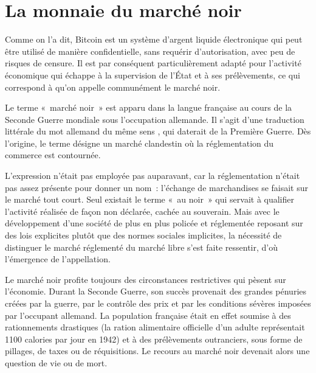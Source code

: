 
\section*{La monnaie du marché noir}

Comme on l'a dit, Bitcoin est un système d'argent liquide électronique qui peut être utilisé de manière confidentielle, sans requérir d'autorisation, avec peu de risques de censure. Il est par conséquent particulièrement adapté pour l'activité économique qui échappe à la supervision de l'État et à ses prélèvements, ce qui correspond à qu'on appelle communément le marché noir.


Le terme «~marché noir~» est apparu dans la langue française au cours de la Seconde Guerre mondiale sous l'occupation allemande. Il s'agit d'une traduction littérale du mot allemand du même sens , qui daterait de la Première Guerre. Dès l'origine, le terme désigne un marché clandestin où la réglementation du commerce est contournée.

L'expression n'était pas employée pas auparavant, car la réglementation n'était pas assez présente pour donner un nom~: l'échange de marchandises se faisait sur le marché tout court. Seul existait le terme «~au noir~» qui servait à qualifier l'activité réalisée de façon non déclarée, cachée au souverain. Mais avec le développement d'une société de plus en plus policée et réglementée reposant sur des lois explicites plutôt que des normes sociales implicites, la nécessité de distinguer le marché réglementé du marché libre s'est faite ressentir, d'où l'émergence de l'appellation. 

Le marché noir profite toujours des circonstances restrictives qui pèsent sur l'économie. Durant la Seconde Guerre, son succès provenait des grandes pénuries créées par la guerre, par le contrôle des prix et par les conditions sévères imposées par l'occupant allemand. La population française était en effet soumise à des rationnements drastiques (la ration alimentaire officielle d'un adulte représentait 1100 calories par jour en 1942) et à des prélèvements outranciers, sous forme de pillages, de taxes ou de réquisitions. Le recours au marché noir devenait alors une question de vie ou de mort.

